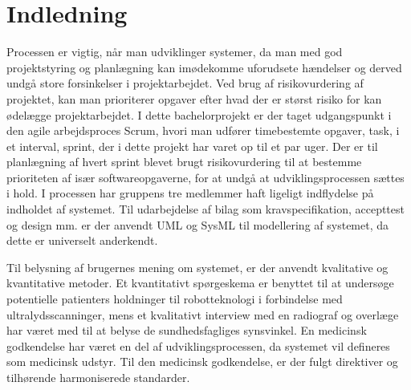 \chapter{Indledning}\label{kapInd}
Processen er vigtig, når man udviklinger systemer, da man med god projektstyring og planlægning kan imødekomme uforudsete hændelser og derved undgå store forsinkelser i projektarbejdet. Ved brug af risikovurdering af projektet, kan man prioriterer opgaver efter hvad der er størst risiko for kan ødelægge projektarbejdet. I dette bachelorprojekt er der taget udgangspunkt i den agile arbejdsproces Scrum, hvori man udfører timebestemte opgaver, task, i et interval, sprint, der i dette projekt har varet op til et par uger. Der er til planlægning af hvert sprint blevet brugt risikovurdering til at bestemme prioriteten af især softwareopgaverne, for at undgå at udviklingsprocessen sættes i hold. 
I processen har gruppens tre medlemmer haft ligeligt indflydelse på indholdet af systemet. Til udarbejdelse af bilag som kravspecifikation, accepttest og design mm. er der anvendt UML og SysML til modellering af systemet, da dette er universelt anderkendt.

Til belysning af brugernes mening om systemet, er der anvendt kvalitative og kvantitative
metoder. Et kvantitativt spørgeskema er benyttet til at undersøge potentielle patienters
holdninger til robotteknologi i forbindelse med ultralydsscanninger, mens et kvalitativt
interview med en radiograf og overlæge har været med til at belyse de sundhedsfagliges
synsvinkel. En medicinsk godkendelse har været en del af udviklingsprocessen, da systemet
vil defineres som medicinsk udstyr. Til den medicinsk godkendelse, er der fulgt direktiver og tilhørende harmoniserede standarder. 




